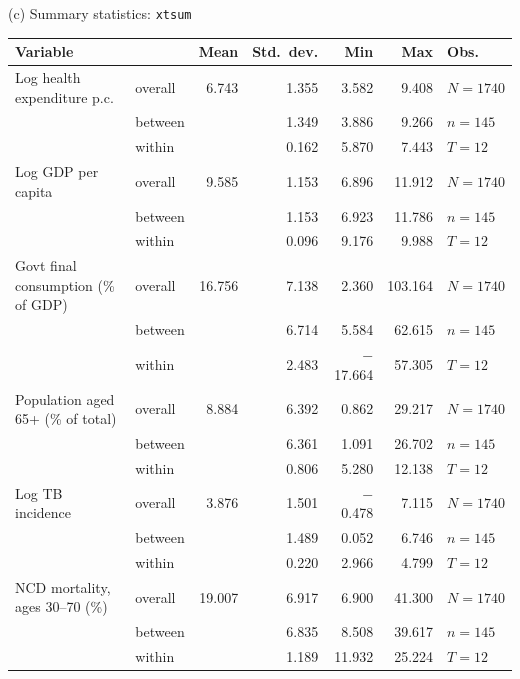 \documentclass[10pt,aspectratio=169,t]{beamer}
\renewcommand{\arraystretch}{1.12}
\begin{document}

\begin{frame}{(c) Summary statistics: \texttt{xtsum}}
\vspace{0.3em}
\begin{center}
\scriptsize
\setlength{\tabcolsep}{6pt}
\renewcommand{\arraystretch}{0.92}
\begin{tabular}{@{}ll rrrr l@{}}
\toprule
Variable & & Mean & Std.\ dev. & Min & Max & Obs. \\
\midrule
Log health expenditure p.c. & overall & 6.743 & 1.355 & 3.582 & 9.408 & $N=1740$ \\
 & between & & 1.349 & 3.886 & 9.266 & $n=145$ \\
 & within  & & \alert{0.162} & 5.870 & 7.443 & $T=12$ \\
\addlinespace
Log GDP per capita & overall & 9.585 & 1.153 & 6.896 & 11.912 & $N=1740$ \\
 & between & & 1.153 & 6.923 & 11.786 & $n=145$ \\
 & within  & & \alert{0.096} & 9.176 & 9.988 & $T=12$ \\
\addlinespace
Govt final consumption (\% of GDP) & overall & 16.756 & 7.138 & 2.360 & 103.164 & $N=1740$ \\
 & between & & 6.714 & 5.584 & 62.615 & $n=145$ \\
 & within  & & \alert{2.483} & $-$17.664 & 57.305 & $T=12$ \\
\addlinespace
Population aged 65+ (\% of total) & overall & 8.884 & 6.392 & 0.862 & 29.217 & $N=1740$ \\
 & between & & 6.361 & 1.091 & 26.702 & $n=145$ \\
 & within  & & \alert{0.806} & 5.280 & 12.138 & $T=12$ \\
\addlinespace
Log TB incidence & overall & 3.876 & 1.501 & $-$0.478 & 7.115 & $N=1740$ \\
 & between & & 1.489 & 0.052 & 6.746 & $n=145$ \\
 & within  & & \alert{0.220} & 2.966 & 4.799 & $T=12$ \\
\addlinespace
NCD mortality, ages 30--70 (\%) & overall & 19.007 & 6.917 & 6.900 & 41.300 & $N=1740$ \\
 & between & & 6.835 & 8.508 & 39.617 & $n=145$ \\
 & within  & & \alert{1.189} & 11.932 & 25.224 & $T=12$ \\
\bottomrule
\end{tabular}
\end{center}
\vspace{0.3em}


\end{frame}
\end{document}
